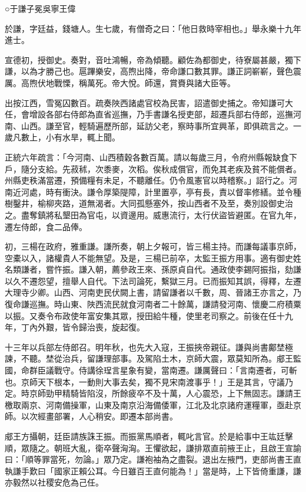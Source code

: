 
\begin{pinyinscope}
○于謙子冕吳寧王偉

於謙，字廷益，錢塘人。生七歲，有僧奇之曰：「他日救時宰相也。」舉永樂十九年進士。

宣德初，授御史。奏對，音吐鴻暢，帝為傾聽。顧佐為都御史，待寮屬甚嚴，獨下謙，以為才勝己也。扈蹕樂安，高煦出降，帝命謙口數其罪。謙正詞嶄嶄，聲色震厲。高煦伏地戰慄，稱萬死。帝大悅。師還，賞賚與諸大臣等。

出按江西，雪冤囚數百。疏奏陜西諸處官校為民害，詔遣御史捕之。帝知謙可大任，會增設各部右侍郎為直省巡撫，乃手書謙名授吏部，超遷兵部右侍郎，巡撫河南、山西。謙至官，輕騎遍歷所部，延訪父老，察時事所宜興革，即俱疏言之。一歲凡數上，小有水旱，輒上聞。

正統六年疏言：「今河南、山西積穀各數百萬。請以每歲三月，令府州縣報缺食下戶，隨分支給。先菽秫，次黍麥，次稻。俟秋成償官，而免其老疾及貧不能償者。州縣吏秩滿當遷，預備糧有未足，不聽離任。仍令風憲官以時稽察。」詔行之。河南近河處，時有衝決。謙令厚築隄障，計里置亭，亭有長，責以督率修繕。並令種樹鑿井，榆柳夾路，道無渴者。大同孤懸塞外，按山西者不及至，奏別設御史治之。盡奪鎮將私墾田為官屯，以資邊用。威惠流行，太行伏盜皆避匿。在官九年，遷左侍郎，食二品俸。

初，三楊在政府，雅重謙。謙所奏，朝上夕報可，皆三楊主持。而謙每議事京師，空橐以入，諸權貴人不能無望。及是，三楊已前卒，太監王振方用事。適有御史姓名類謙者，嘗忤振。謙入朝，薦參政王來、孫原貞自代。通政使李錫阿振指，劾謙以久不遷怨望，擅舉人自代。下法司論死，繫獄三月。已而振知其誤，得釋，左遷大理寺少卿。山西、河南吏民伏闕上書，請留謙者以千數，周、晉諸王亦言之，乃復命謙巡撫。時山東、陜西流民就食河南者二十餘萬，謙請發河南、懷慶二府積粟以振。又奏令布政使年富安集其眾，授田給牛種，使里老司察之。前後在任十九年，丁內外艱，皆令歸治喪，旋起復。

十三年以兵部左侍郎召。明年秋，也先大入寇，王振挾帝親征。謙與尚書鄺埜極諫，不聽。埜從治兵，留謙理部事。及駕陷土木，京師大震，眾莫知所為。郕王監國，命群臣議戰守。侍講徐珵言星象有變，當南遷。謙厲聲曰：「言南遷者，可斬也。京師天下根本，一動則大事去矣，獨不見宋南渡事乎！」王是其言，守議乃定。時京師勁甲精騎皆陷沒，所餘疲卒不及十萬，人心震恐，上下無固志。謙請王檄取兩京、河南備操軍，山東及南京沿海備倭軍，江北及北京諸府運糧軍，亟赴京師。以次經畫部署，人心稍安。即遷本部尚書。

郕王方攝朝，廷臣請族誅王振。而振黨馬順者，輒叱言官。於是給事中王竑廷擊順，眾隨之。朝班大亂，衛卒聲洶洶。王懼欲起，謙排眾直前掖王止，且啟王宣諭曰：「順等罪當死，勿論。」眾乃定。謙袍袖為之盡裂。退出左掖門，吏部尚書王直執謙手歎曰「國家正賴公耳。今日雖百王直何能為！」當是時，上下皆倚重謙，謙亦毅然以社稷安危為己任。


\end{pinyinscope}
